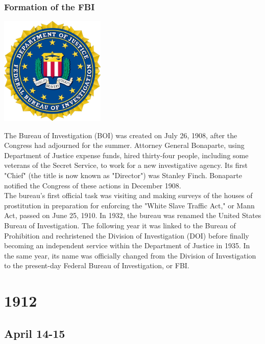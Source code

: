 \documentclass[11pt]{report}
\begin{document}
\subsection{Formation of the FBI}
\vspace{2mm}\begin{center}\includegraphics[width=5cm]{./img/FBILogo.jpg}\end{center}
The Bureau of Investigation (BOI) was created on July 26, 1908, after the Congress had adjourned for the summer. Attorney General Bonaparte, using Department of Justice expense funds, hired thirty-four people, including some veterans of the Secret Service, to work for a new investigative agency. Its first "Chief" (the title is now known as "Director") was Stanley Finch. Bonaparte notified the Congress of these actions in December 1908.\\
The bureau's first official task was visiting and making surveys of the houses of prostitution in preparation for enforcing the "White Slave Traffic Act," or Mann Act, passed on June 25, 1910. In 1932, the bureau was renamed the United States Bureau of Investigation. The following year it was linked to the Bureau of Prohibition and rechristened the Division of Investigation (DOI) before finally becoming an independent service within the Department of Justice in 1935. In the same year, its name was officially changed from the Division of Investigation to the present-day Federal Bureau of Investigation, or FBI.

\chapter{1912}
\section{April 14-15}
\end{document}
